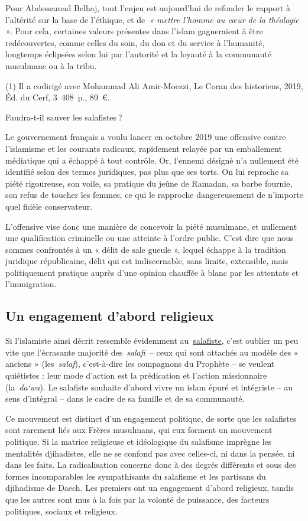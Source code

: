 Pour Abdessamad Belhaj, tout l'enjeu est aujourd'hui de refonder le
rapport à l'altérité sur la base de l'éthique, et de\emph{~« mettre
l'homme au cœur de la théologie »}. Pour cela, certaines valeurs
présentes dans l'islam gagneraient à être redécouvertes, comme celles du
soin, du don et du service à l'humanité, longtemps éclipsées selon lui
par l'autorité et la loyauté à la communauté musulmane ou à la tribu.

(1) Il a codirigé avec Mohammad Ali Amir-Moezzi, Le Coran des
historiens, 2019, Éd. du Cerf, 3~408~p., 89~€.

Faudra-t-il sauver les salafistes ?

Le gouvernement français a voulu lancer en octobre 2019 une offensive
contre l'islamisme et les courants radicaux, rapidement relayée par un
emballement médiatique qui a échappé à tout contrôle. Or, l'ennemi
désigné n'a nullement été identifié selon des termes juridiques, pas
plus que ses torts. On lui reproche sa piété rigoureuse, son voile, sa
pratique du jeûne de Ramadan, sa barbe fournie, son refus de toucher les
femmes, ce qui le rapproche dangereusement de n'importe quel fidèle
conservateur.

L'offensive vise donc une manière de concevoir la piété musulmane, et
nullement une qualification criminelle ou une atteinte à l'ordre public.
C'est dire que nous sommes confrontés à un « délit de sale gueule »,
lequel échappe à la tradition juridique républicaine, délit qui est
indiscernable, sans limite, extensible, mais politiquement pratique
auprès d'une opinion chauffée à blanc par les attentats et
l'immigration.

\subsection{Un engagement d'abord religieux}

Si l'islamiste ainsi décrit ressemble évidemment
au~\href{https://www.la-croix.com/Religion/Islam/Quest-salafisme-2018-10-14-1200975866}{\underline{salafiste}},
c'est oublier un peu vite que l'écrasante majorité des~\emph{salafi~}--
ceux qui sont attachés au modèle des « anciens » (les~\emph{salaf}),
c'est-à-dire les compagnons du Prophète -- se veulent quiétistes : leur
mode d'action est la prédication et l'action missionnaire
(la~\emph{da`wa}). Le salafiste souhaite d'abord vivre un islam épuré et
intégriste -- au sens d'intégral -- dans le cadre de sa famille et de sa
communauté.

Ce mouvement est distinct d'un engagement politique, de sorte que les
salafistes sont rarement liés aux Frères musulmans, qui eux forment un
mouvement politique. Si la matrice religieuse et idéologique du
salafisme imprègne les mentalités djihadistes, elle ne se confond pas
avec celles-ci, ni dans la pensée, ni dans les faits. La radicalisation
concerne donc à des degrés différents et sous des formes incomparables
les sympathisants du salafisme et les partisans du djihadisme de Daech.
Les premiers ont un engagement d'abord religieux, tandis que les autres
sont mus à la fois par la volonté de puissance, des facteurs politiques,
sociaux et religieux.

